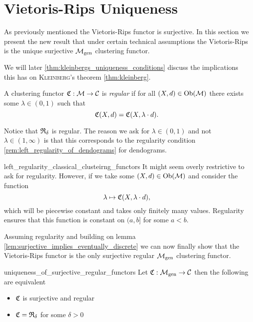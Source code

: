 \section[Vietoris-Rips Uniqueness]{Vietoris-Rips Uniqueness \newresult[]}

As previously mentioned the Vietoris-Rips functor is surjective.
In this section we present the new result that under certain technical assumptions the Vietoris-Rips is the unique surjective ${\mathcal{M}_\mathrm{gen}}$ clustering functor.

We will later  \ref{thm:kleinbergs_uniqueness_conditions} discuss the implications this has on \textsc{Kleinberg}'s theorem \ref{thm:kleinberg}. 

\begin{definition}{}{}
    A clustering functor $\mathfrak{C}: \mathcal{M} \to \mathcal{C}$ is \emph{regular} if for all $(X,d) \in \mathrm {Ob}(\mathcal{M})$ there exists some $\lambda \in (0, 1)$ such that
    $$
    \mathfrak{C}(X,d) = \mathfrak{C}(X, \lambda \cdot d).
    $$
    
\end{definition}

Notice that $\mathfrak{R}_\delta$ is regular. The reason we ask for $\lambda \in (0,1)$ and not $\lambda \in (1, \infty)$ is that this corresponds to the regularity condition \ref{rem:left_regularity_of_dendograms} for dendograms.\par

\begin{myremark}{}{left_regularity_classical_clusteirng_functors}
    \medskip It might seem overly restrictive to ask for regularity.
    However, if we take some $(X, d) \in \mathrm {Ob}(\mathcal{M})$ and consider the function 
    $$
    \lambda \mapsto \mathfrak{C}(X, \lambda \cdot d),
    $$
    which will be piecewise constant and takes only finitely many values.
    Regularity ensures that this function is constant on $(a, b]$ for some $a < b$.
\end{myremark}

Assuming regularity and building on lemma \ref{lem:surjective_implies_eventually_discrete} we can now finally show that the Vietoris-Rips functor is the only surjective regular ${\mathcal{M}_\mathrm{gen}}$ clustering functor.

\begin{theorem}{}{uniqueness_of_surjective_regular_functors}
    Let $\mathfrak{C}: {\mathcal{M}_\mathrm{gen}} \to \mathcal{C}$ then the following are equivalent

    \begin{itemize}
        \item $\mathfrak{C}$ is surjective and regular
        \item $\mathfrak{C} = \mathfrak{R}_{\delta}$ for some $\delta > 0$
    \end{itemize}
\end{theorem}


